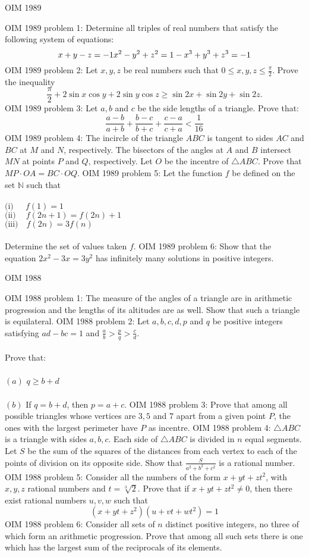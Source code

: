 OIM 1989 

OIM 1989 problem 1:  Determine all triples of real numbers that satisfy the following system of equations:
\[ x+y-z=-1\\ x^2-y^2+z^2=1\\ -x^3+y^3+z^3=-1 \] 
OIM 1989 problem 2:  Let $x,y,z$ be real numbers such that $0\le x,y,z\le\frac{\pi}{2}$. Prove the inequality
\[ \frac{\pi}{2}+2\sin x\cos y+2\sin y\cos z\ge\sin 2x+\sin 2y+\sin 2z. \] 
OIM 1989 problem 3:  Let $a,b$ and $c$ be the side lengths of a triangle. Prove that:
\[ \frac{a-b}{a+b}+\frac{b-c}{b+c}+\frac{c-a}{c+a}<\frac{1}{16} \] 
OIM 1989 problem 4:  The incircle of the triangle $ABC$ is tangent to sides $AC$ and $BC$ at $M$ and $N$, respectively. The bisectors of the angles at $A$ and $B$ intersect $MN$ at points $P$ and $Q$, respectively. Let $O$ be the incentre of $\triangle ABC$. Prove that $MP\cdot OA=BC\cdot OQ$. 
OIM 1989 problem 5:  Let the function $f$ be defined on the set $\mathbb{N}$ such that \\\\
$\text{(i)}\ \ \quad f(1)=1$ \\
$\text{(ii)}\ \quad f(2n+1)=f(2n)+1$ \\
$\text{(iii)}\quad f(2n)=3f(n)$ \\\\
Determine the set of values taken $f$. 
OIM 1989 problem 6:  Show that the equation $2x^2-3x=3y^2$ has infinitely many solutions in positive integers. 

OIM 1988 

OIM 1988 problem 1:  The measure of the angles of a triangle are in arithmetic progression and the lengths of its altitudes are as well. Show that such a triangle is equilateral. 
OIM 1988 problem 2:  Let $a,b,c,d,p$ and $q$ be positive integers satisfying $ad-bc=1$ and $\frac{a}{b}>\frac{p}{q}>\frac{c}{d}$. \\\\
Prove that: \\\\
$(a)$ $q\ge b+d$ \\\\
$(b)$ If $q=b+d$, then $p=a+c$. 
OIM 1988 problem 3:  Prove that among all possible triangles whose vertices are $3,5$ and $7$ apart from a given point $P$, the ones with the largest perimeter have $P$ as incentre. 
OIM 1988 problem 4:  $\triangle ABC$ is a triangle with sides $a,b,c$. Each side of $\triangle ABC$ is divided in $n$ equal segments. Let $S$ be the sum of the squares of the distances from each vertex to each of the points of division on its opposite side. Show that $\frac{S}{a^2+b^2+c^2}$ is a rational number. 
OIM 1988 problem 5:  Consider all the numbers of the form $x+yt+zt^2$, with $x,y,z$ rational numbers and $t=\sqrt[3]{2}$. Prove that if $x+yt+zt^2\not= 0$, then there exist rational numbers $u,v,w$ such that
\[ (x+yt+z^2)(u+vt+wt^2)=1 \] 
OIM 1988 problem 6:  Consider all sets of $n$ distinct positive integers, no three of which form an arithmetic progression. Prove that among all such sets there is one which has the largest sum of the reciprocals of its elements. 

